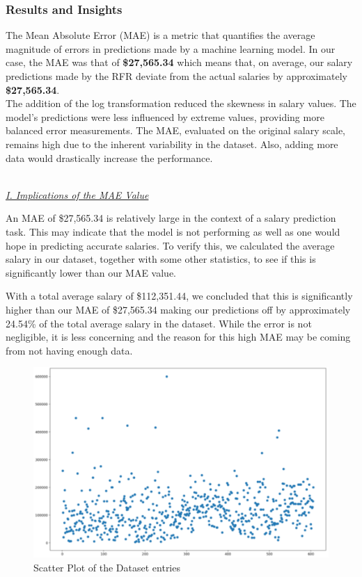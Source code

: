 \documentclass[11pt,a4paper]{article}
\newcommand{\subsubsubsection}[1]{
  {\setlength\itemindent{13pt} \textit{\uline{\\#1\\}}} 
}
\begin{document}
\subsubsection{Results and Insights}
The Mean Absolute Error (MAE) is a metric that quantifies the average magnitude of errors in predictions made by a machine learning model. In our case, the MAE was that of \textbf{\$27,565.34} which means that, on average, our salary predictions made by the RFR deviate from the actual salaries by approximately \textbf{\$27,565.34}. 
\\
The addition of the log transformation reduced the skewness in salary values. The model's predictions were less influenced by extreme values, providing more balanced error measurements. The MAE, evaluated on the original salary scale, remains high due to the inherent variability in the dataset. Also, adding more data would drastically increase the performance.
\subsubsubsection{I. Implications of the MAE Value}
An MAE of \$27,565.34 is relatively large in the context of a salary prediction task. This may indicate that the model is not performing as well as one would hope in predicting accurate salaries. To verify this, we calculated the average salary in our dataset, together with some other statistics, to see if this is significantly lower than our MAE value.

With a total average salary of \$112,351.44, we concluded that this is significantly higher than our MAE of \$27,565.34 making our predictions off by approximately 24.54\% of the total average salary in the dataset. While the error is not negligible, it is less concerning and the reason for this high MAE may be coming from not having enough data.

\begin{figure}
    \centering
    \includegraphics[width=1\linewidth]{ICS-5110_scatterplot.png}
    \caption{Scatter Plot of the Dataset entries}
    \label{fig:Scatter Plot of the Dataset entries}
\end{figure}
\end{document}
